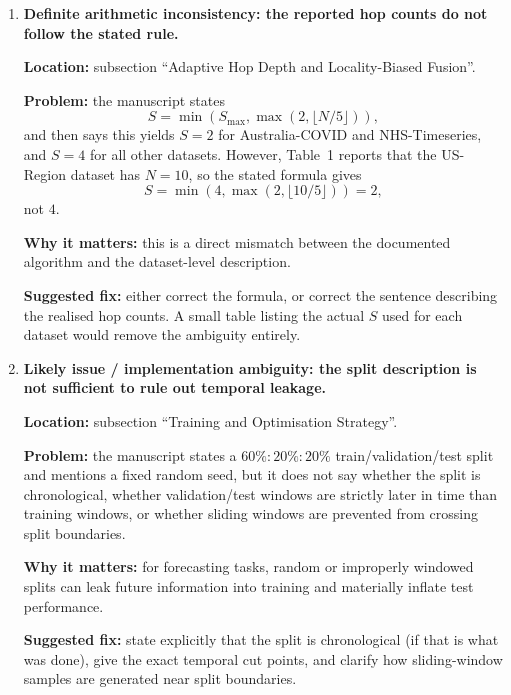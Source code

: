 \documentclass[11pt]{article}
\begin{document}
\begin{enumerate}
\textbf{Why it matters:} this is a reproducibility problem. An implementer cannot recover the intended optimisation objective unambiguously.

\textbf{Suggested fix:} choose one convention and propagate it everywhere. For example, define $\mathcal{L}_{\text{attn}}$ without its coefficient, then use $\mathcal{L}_{\text{total}} = \mathcal{L}_{\text{forecast}} + \lambda_{\text{attn}}\mathcal{L}_{\text{attn}}$ consistently in the text, table, and pseudocode.

\item \textbf{Definite arithmetic inconsistency: the reported hop counts do not follow the stated rule.}

\textbf{Location:} subsection ``Adaptive Hop Depth and Locality-Biased Fusion''.

\textbf{Problem:} the manuscript states
\[
S = \min(S_{\max}, \max(2, \lfloor N/5 \rfloor)),
\]
and then says this yields $S=2$ for Australia-COVID and NHS-Timeseries, and $S=4$ for all other datasets. However, Table~1 reports that the US-Region dataset has $N=10$, so the stated formula gives
\[
S = \min(4, \max(2, \lfloor 10/5 \rfloor)) = 2,
\]
not $4$.

\textbf{Why it matters:} this is a direct mismatch between the documented algorithm and the dataset-level description.

\textbf{Suggested fix:} either correct the formula, or correct the sentence describing the realised hop counts. A small table listing the actual $S$ used for each dataset would remove the ambiguity entirely.

\item \textbf{Likely issue / implementation ambiguity: the split description is not sufficient to rule out temporal leakage.}

\textbf{Location:} subsection ``Training and Optimisation Strategy''.

\textbf{Problem:} the manuscript states a $60\%{:}20\%{:}20\%$ train/validation/test split and mentions a fixed random seed, but it does not say whether the split is chronological, whether validation/test windows are strictly later in time than training windows, or whether sliding windows are prevented from crossing split boundaries.

\textbf{Why it matters:} for forecasting tasks, random or improperly windowed splits can leak future information into training and materially inflate test performance.

\textbf{Suggested fix:} state explicitly that the split is chronological (if that is what was done), give the exact temporal cut points, and clarify how sliding-window samples are generated near split boundaries.


\end{enumerate}
\end{document}
